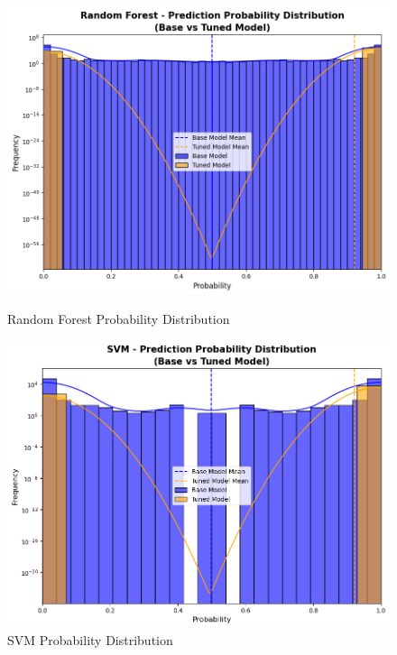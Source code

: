             \begin{figure}[h]
                \centering
                \begin{minipage}[c]{0.47\textwidth}
                    \centering
                    \includegraphics[width=\textwidth]{../figures/plots/section2/Random_Forest_Probability_distribution.png}
                    \caption{Random Forest Probability Distribution}
                    \label{fig:rf-probability-distribution}
                \end{minipage}
                \hfill
                \begin{minipage}[c]{0.47\textwidth}
                    \centering
                    \includegraphics[width=\textwidth]{../figures/plots/section2/SVM_Probability_distribution.png}
                    \caption{SVM Probability Distribution}
                    \label{fig:svm-probability-distribution}
                \end{minipage}
            \end{figure}
        